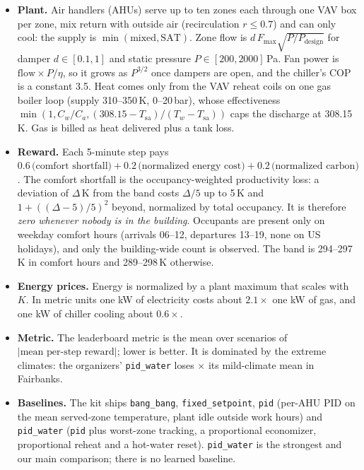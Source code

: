 \documentclass{article}
\begin{document}
\begin{itemize}
\item \textbf{Plant.} Air handlers (AHUs) serve up to ten zones each through one VAV box per zone, mix return with outside air (recirculation $r\le 0.7$) and can only cool: the supply is $\min(\text{mixed}, \text{SAT})$. Zone flow is $d\,F_{\max}\sqrt{P/P_{\text{design}}}$ for damper $d\in[0.1,1]$ and static pressure $P\in[200,2000]$\,Pa. Fan power is $\text{flow}\times P/\eta$, so it grows as $P^{3/2}$ once dampers are open, and the chiller's COP is a constant 3.5. Heat comes only from the VAV reheat coils on one gas boiler loop (supply 310--350\,K, 0--20\,bar), whose effectiveness $\min(1, C_w/C_a, (308.15-T_{\text{sa}})/(T_w - T_{\text{sa}}))$ caps the discharge at 308.15\,K. Gas is billed as heat delivered plus a tank loss.
\item \textbf{Reward.} Each 5-minute step pays $0.6\,\text{(comfort shortfall)} + 0.2\,\text{(normalized energy cost)} + 0.2\,\text{(normalized carbon)}$. The comfort shortfall is the occupancy-weighted productivity loss: a deviation of $\Delta$\,K from the band costs $\Delta/5$ up to 5\,K and $1+((\Delta-5)/5)^2$ beyond, normalized by total occupancy. It is therefore \emph{zero whenever nobody is in the building}. Occupants are present only on weekday comfort hours (arrivals 06--12, departures 13--19, none on US holidays), and only the building-wide count is observed. The band is 294--297\,K in comfort hours and 289--298\,K otherwise.
\item \textbf{Energy prices.} Energy is normalized by a plant maximum that scales with $K$. In metric units one kW of electricity costs about $2.1\times$ one kW of gas, and one kW of chiller cooling about $0.6\times$.
\item \textbf{Metric.} The leaderboard metric is the mean over scenarios of $|\text{mean per-step reward}|$; lower is better. It is dominated by the extreme climates: the organizers' \texttt{pid\_water} loses \ExtremeRatioFairbanks$\times$ its mild-climate mean in Fairbanks.
\item \textbf{Baselines.} The kit ships \texttt{bang\_bang}, \texttt{fixed\_setpoint}, \texttt{pid} (per-AHU PID on the mean served-zone temperature, plant idle outside work hours) and \texttt{pid\_water} (\texttt{pid} plus worst-zone tracking, a proportional economizer, proportional reheat and a hot-water reset). \texttt{pid\_water} is the strongest and our main comparison; there is no learned baseline.
\end{itemize}
\end{document}
